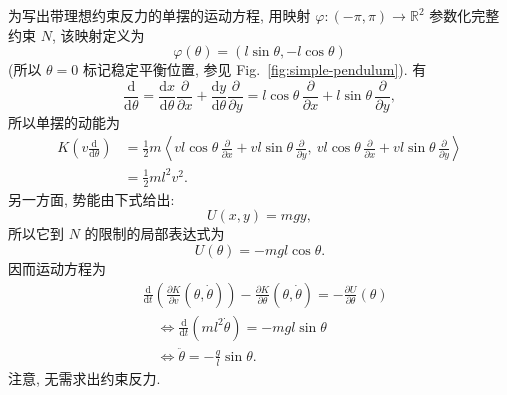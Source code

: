\begin{RiemannExample}\label{ex:simple-pendulum-equation-of-motion}
为写出带理想约束反力的单摆的运动方程, 用映射 $\varphi:(-\pi,\pi)\to\mathbb{R}^2$ 参数化完整约束 $N$, 该映射定义为
\[
  \varphi(\theta)=(l\sin\theta,-l\cos\theta)
\]
(所以 $\theta=0$ 标记稳定平衡位置, 参见 Fig.~\ref{fig:simple-pendulum}). 有
\[
  \frac{\mathrm{d}}{\mathrm{d}\theta}
  =\frac{\mathrm{d}x}{\mathrm{d}\theta}\frac{\partial}{\partial x}
   +\frac{\mathrm{d}y}{\mathrm{d}\theta}\frac{\partial}{\partial y}
  =l\cos\theta\,\frac{\partial}{\partial x}+l\sin\theta\,\frac{\partial}{\partial y},
\]
所以单摆的动能为
\begin{align*}
  K\left(v\frac{\mathrm{d}}{\mathrm{d}\theta}\right)
  &=\frac12m\left\langle
      vl\cos\theta\,\frac{\partial}{\partial x}+vl\sin\theta\,\frac{\partial}{\partial y},\
      vl\cos\theta\,\frac{\partial}{\partial x}+vl\sin\theta\,\frac{\partial}{\partial y}
      \right\rangle\\
  &=\frac12ml^2v^2.
\end{align*}
另一方面, 势能由下式给出:
\[
  U(x,y)=mgy,
\]
所以它到 $N$ 的限制的局部表达式为
\[
  U(\theta)=-mgl\cos\theta.
\]
因而运动方程为
\begin{align*}
  &\frac{\mathrm{d}}{\mathrm{d}t}\left(\frac{\partial K}{\partial v}(\theta,\dot\theta)\right)
   -\frac{\partial K}{\partial\theta}(\theta,\dot\theta)=-\frac{\partial U}{\partial\theta}(\theta)\\
  &\quad\Leftrightarrow\frac{\mathrm{d}}{\mathrm{d}t}(ml^2\dot\theta)=-mgl\sin\theta\\
  &\quad\Leftrightarrow\ddot\theta=-\frac gl\sin\theta.
\end{align*}
注意, 无需求出约束反力.
\end{RiemannExample}

